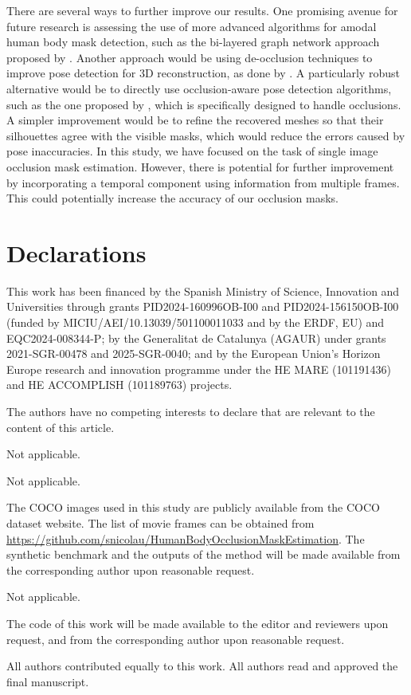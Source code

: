 \documentclass[pdflatex,sn-mathphys-num]{sn-jnl}%
\begin{document}
There are several ways to further improve our results. One promising avenue for future research is assessing the use of more advanced algorithms for amodal human body mask detection, such as the bi-layered graph network approach proposed by \citet{BiLayers}. Another approach would be using de-occlusion techniques to improve pose detection for 3D reconstruction, as done by \citet{sym14030531}. A particularly robust alternative would be to directly use occlusion-aware pose detection algorithms, such as the one proposed by \citet{OccShapePose}, which is specifically designed to handle occlusions. A simpler improvement would be to refine the recovered meshes so that their silhouettes agree with the visible masks, which would reduce the errors caused by pose inaccuracies. In this study, we have focused on the task of single image occlusion mask estimation. However, there is potential for further improvement by incorporating a temporal component using information from multiple frames. This could potentially increase the accuracy of our occlusion masks.

\backmatter

\section*{Declarations}

This work has been financed by the Spanish Ministry of Science, Innovation and Universities through grants PID2024-160996OB-I00 and PID2024-156150OB-I00 (funded by MICIU/AEI/10.13039/501100011033 and by the ERDF, EU) and EQC2024-008344-P; by the Generalitat de Catalunya (AGAUR) under grants 2021-SGR-00478 and 2025-SGR-0040; and by the European Union's Horizon Europe research and innovation programme under the HE MARE (101191436) and HE ACCOMPLISH (101189763) projects.

The authors have no competing interests to declare that are relevant to the content of this article.

Not applicable.

Not applicable.

The COCO images used in this study are publicly available from the COCO dataset website. The list of movie frames can be obtained from \url{https://github.com/snicolau/HumanBodyOcclusionMaskEstimation}. The synthetic benchmark and the outputs of the method will be made available from the corresponding author upon reasonable request.

Not applicable.

The code of this work will be made available to the editor and
reviewers upon request, and from the corresponding author upon reasonable request.

All authors contributed equally to this work. All authors read and approved the final manuscript.


\end{document}
